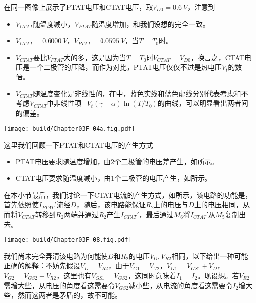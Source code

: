 在同一图像上展示了PTAT电压和CTAT电压，取$V_{D0}=\SI{0.6}{V}$，注意到
\begin{itemize}
    \item $V_{CTAT}$随温度减小，$V_{PTAT}$随温度增加，和我们设想的完全一致。
    \item $V_{CTAT}=\SI{0.6000}{V}$，$V_{PTAT}=\SI{0.0595}{V}$，当$T=T_0$时。
    \item $V_{CTAT}$要比$V_{PTAT}$大的多，这是因为当$T=T_0$时$V_{CTAT}=V_{D0}$，换言之，CTAT电压是一个二极管的压降，而作为对比，PTAT电压仅仅不过是热电压$V_t$的数倍。
    \item $V_{CTAT}$随温度变化是非线性的，在中，蓝色实线和蓝色虚线分别代表考虑和不考虑$V_{CTAT}$中非线性项$-V_t(\gamma-\alpha)\ln(T/T_0)$的曲线，可以明显看出两者间的偏差。
\end{itemize}
\begin{Figure}[PTAT电压和CTAT电压]
    \texttt{[image: build/Chapter03F\_04a.fig.pdf]}
\end{Figure}

这里我们回顾一下PTAT和CTAT电压的产生方式
\begin{itemize}
    \item PTAT电压要求随温度增加，由$2$个二极管的电压差产生，如所示。
    \item CTAT电压要求随温度减小，由$1$个二极管的电压产生，如所示。
\end{itemize}
在本小节最后，我们讨论一下CTAT电流的产生方式，如所示，该电路的功能是，首先依照使$I_{PTAT}'$流经$D$，随后，该电路能保证$R_2$上的电压与$D$上的电压相同，从而将$V_{CTAT}$转移到$R_2$两端并通过$R_2$产生$I_{CTAT}'$，最后通过$M_6$将$I_{CTAT}'$从$M_5$复制出去。
\begin{Figure}[CTAT电流产生电路]
    \texttt{[image: build/Chapter03F\_08.fig.pdf]}
\end{Figure}
我们尚未完全弄清该电路为何能使$D$和$R_2$的电压$V_{D},V_{R2}$相同，以下给出一种可能正确的解释：不妨先假设$V_{D}=V_{R2}$，由于$V_{G1}=V_{G2}$，$V_{G1}=V_{GS1}+V_D$，$V_{G2}=V_{GS2}+V_{R2}$，这里也有$V_{GS1}=V_{GS2}$，这同时意味着$I_1=I_2$。现设想。若$V_{R2}$需增大些，从电压的角度看这需要令$V_{GS2}$减小些，从电流的角度看这需要令$I_2$增大些，然而这两者是矛盾的，故不可能。

